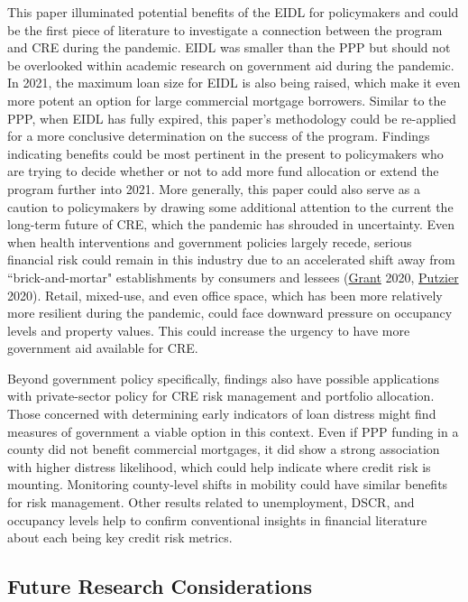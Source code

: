 \documentclass[11pt]{article} %
\begin{document}
This paper illuminated potential benefits of the EIDL for policymakers and could be the first piece of literature to investigate a connection between the program and CRE during the pandemic. EIDL was smaller than the PPP but should not be overlooked within academic research on government aid during the pandemic. In 2021, the maximum loan size for EIDL is also being raised, which make it even more potent an option for large commercial mortgage borrowers. Similar to the PPP, when EIDL has fully expired, this paper's methodology could be re-applied for a more conclusive determination on the success of the program. Findings indicating benefits could be most pertinent in the present to policymakers who are trying to decide whether or not to add more fund allocation or extend the program further into 2021. More generally, this paper could also serve as a caution to policymakers by drawing some additional attention to the current the long-term future of CRE, which the pandemic has shrouded in uncertainty. Even when health interventions and government policies largely recede, serious financial risk could remain in this industry due to an accelerated shift away from ``brick-and-mortar" establishments by consumers and lessees (\hyperlink{Grant}{Grant} 2020, \hyperlink{Putzier}{Putzier} 2020). Retail, mixed-use, and even office space, which has been more relatively more resilient during the pandemic, could face downward pressure on occupancy levels and property values. This could increase the urgency to have more government aid available for CRE.

Beyond government policy specifically, findings also have possible applications with private-sector policy for CRE risk management and portfolio allocation. Those concerned with determining early indicators of loan distress might find measures of government a viable option in this context. Even if PPP funding in a county did not benefit commercial mortgages, it did show a strong association with higher distress likelihood, which could help indicate where credit risk is mounting. Monitoring county-level shifts in mobility could have similar benefits for risk management. Other results related to unemployment, DSCR, and occupancy levels help to confirm conventional insights in financial literature about each being key credit risk metrics. 


\subsection{Future Research Considerations}
\end{document}
